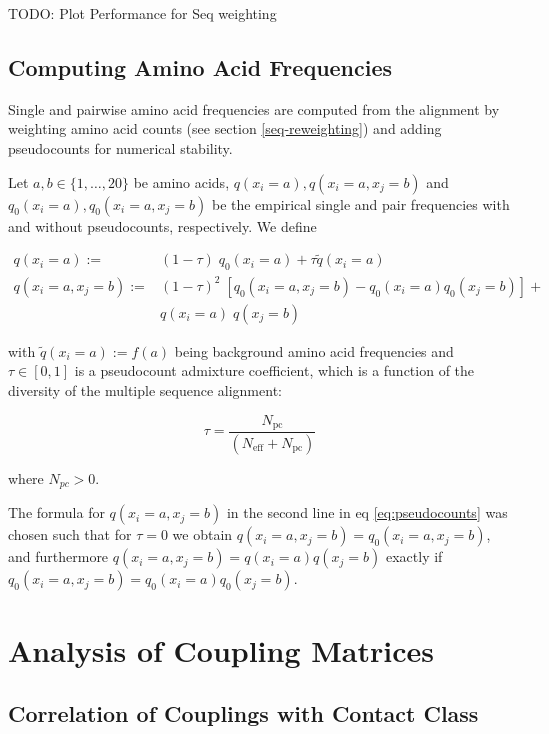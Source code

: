 \documentclass[12pt,a4paper,twoside]{book}
\newcommand{\eq}{\!=\!}
\theoremstyle{definition}
\theoremstyle{definition}
\theoremstyle{remark}
\begin{document}
TODO: Plot Performance for Seq weighting

\subsection{Computing Amino Acid
Frequencies}\label{amino-acid-frequencies}

Single and pairwise amino acid frequencies are computed from the
alignment by weighting amino acid counts (see section
\ref{seq-reweighting}) and adding pseudocounts for numerical stability.

Let \(a,b \in \{1,\ldots,20\}\) be amino acids,
\(q(x_i=a), q(x_i=a, x_j=b)\) and \(q_0(x_i=a), q_0(x_i=a,x_j=b)\) be
the empirical single and pair frequencies with and without pseudocounts,
respectively. We define

\begin{align}
    q(x_i \eq a) :=& (1-\tau) \;  q_0(x_i \eq a) + \tau \tilde{q}(x_i\eq a) \\
    q(x_i \eq a, x_j \eq b) :=& (1-\tau)^2  \; [ q_0(x_i \eq a, x_j \eq b) - q_0(x_i \eq a)  q_0(x_j \eq b) ] + \\
                            & q(x_i \eq a) \; q(x_j \eq b) 
\label{eq:pseudocounts}
\end{align}

with \(\tilde{q}(x_i \eq a) := f(a)\) being background amino acid
frequencies and \(\tau \in [0,1]\) is a pseudocount admixture
coefficient, which is a function of the diversity of the multiple
sequence alignment:

\begin{equation}
    \tau = \frac{N_\mathrm{pc}}{(N_\mathrm{eff} + N_\mathrm{pc})}
\label{eq:tau}
\end{equation}

where \(N_{pc} > 0\).

The formula for \(q(x_i \eq a, x_j \eq b)\) in the second line in eq
\eqref{eq:pseudocounts} was chosen such that for \(\tau \eq0\) we obtain
\(q(x_i \eq a, x_j \eq b) = q_0(x_i \eq a, x_j \eq b)\), and furthermore
\(q(x_i \eq a, x_j \eq b) = q(x_i \eq a) q(x_j \eq b)\) exactly if
\(q_0(x_i \eq a, x_j \eq b) = q_0(x_i \eq a) q_0(x_j \eq b)\).

\section{Analysis of Coupling
Matrices}\label{analysis-of-coupling-matrices}

\subsection{Correlation of Couplings with Contact
Class}\label{method-coupling-correlation}
\end{document}
